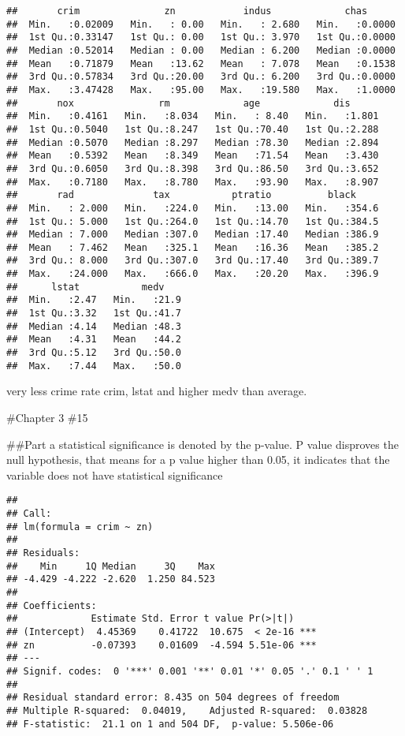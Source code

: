 \documentclass[
]{article}
\begin{document}
\begin{verbatim}
##       crim               zn            indus             chas       
##  Min.   :0.02009   Min.   : 0.00   Min.   : 2.680   Min.   :0.0000  
##  1st Qu.:0.33147   1st Qu.: 0.00   1st Qu.: 3.970   1st Qu.:0.0000  
##  Median :0.52014   Median : 0.00   Median : 6.200   Median :0.0000  
##  Mean   :0.71879   Mean   :13.62   Mean   : 7.078   Mean   :0.1538  
##  3rd Qu.:0.57834   3rd Qu.:20.00   3rd Qu.: 6.200   3rd Qu.:0.0000  
##  Max.   :3.47428   Max.   :95.00   Max.   :19.580   Max.   :1.0000  
##       nox               rm             age             dis       
##  Min.   :0.4161   Min.   :8.034   Min.   : 8.40   Min.   :1.801  
##  1st Qu.:0.5040   1st Qu.:8.247   1st Qu.:70.40   1st Qu.:2.288  
##  Median :0.5070   Median :8.297   Median :78.30   Median :2.894  
##  Mean   :0.5392   Mean   :8.349   Mean   :71.54   Mean   :3.430  
##  3rd Qu.:0.6050   3rd Qu.:8.398   3rd Qu.:86.50   3rd Qu.:3.652  
##  Max.   :0.7180   Max.   :8.780   Max.   :93.90   Max.   :8.907  
##       rad              tax           ptratio          black      
##  Min.   : 2.000   Min.   :224.0   Min.   :13.00   Min.   :354.6  
##  1st Qu.: 5.000   1st Qu.:264.0   1st Qu.:14.70   1st Qu.:384.5  
##  Median : 7.000   Median :307.0   Median :17.40   Median :386.9  
##  Mean   : 7.462   Mean   :325.1   Mean   :16.36   Mean   :385.2  
##  3rd Qu.: 8.000   3rd Qu.:307.0   3rd Qu.:17.40   3rd Qu.:389.7  
##  Max.   :24.000   Max.   :666.0   Max.   :20.20   Max.   :396.9  
##      lstat           medv     
##  Min.   :2.47   Min.   :21.9  
##  1st Qu.:3.32   1st Qu.:41.7  
##  Median :4.14   Median :48.3  
##  Mean   :4.31   Mean   :44.2  
##  3rd Qu.:5.12   3rd Qu.:50.0  
##  Max.   :7.44   Max.   :50.0
\end{verbatim}

very less crime rate crim, lstat and higher medv than average.

\#Chapter 3 \#15

\#\#Part a statistical significance is denoted by the p-value. P value
disproves the null hypothesis, that means for a p value higher than
0.05, it indicates that the variable does not have statistical
significance

\begin{verbatim}
## 
## Call:
## lm(formula = crim ~ zn)
## 
## Residuals:
##    Min     1Q Median     3Q    Max 
## -4.429 -4.222 -2.620  1.250 84.523 
## 
## Coefficients:
##             Estimate Std. Error t value Pr(>|t|)    
## (Intercept)  4.45369    0.41722  10.675  < 2e-16 ***
## zn          -0.07393    0.01609  -4.594 5.51e-06 ***
## ---
## Signif. codes:  0 '***' 0.001 '**' 0.01 '*' 0.05 '.' 0.1 ' ' 1
## 
## Residual standard error: 8.435 on 504 degrees of freedom
## Multiple R-squared:  0.04019,    Adjusted R-squared:  0.03828 
## F-statistic:  21.1 on 1 and 504 DF,  p-value: 5.506e-06
\end{verbatim}
\end{document}
